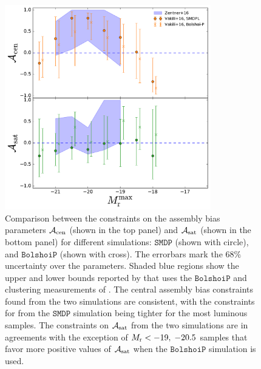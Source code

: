 \documentclass[12pt, preprint]{aastex}
\newcommand{\acen}{\mathcal{A}_{\rm cen}}
\newcommand{\asat}{\mathcal{A}_{\rm sat}}
\begin{document}
\begin{figure}[p]~\\
\begin{center}
\includegraphics[width=0.8\textwidth]{bias_comparison.pdf}
\caption{Comparison between the constraints on the assembly bias parameters $\acen$ (shown in the top panel) and $\asat$ (shown in the bottom panel) for different simulations: $\mathtt{SMDP}$ (shown with circle), and $\mathtt{BolshoiP}$ (shown with cross). The errorbars mark the 68$\%$ uncertainty over the parameters. Shaded blue regions show the upper and lower bounds reported by \citet{zentner2016} that uses the $\mathtt{BolshoiP}$ and clustering measurements of \citet{zehavi2011}. The central assembly bias constraints found from the two simulations are consistent, with the constraints for from the $\mathtt{SMDP}$ simulation being tighter for the most luminous samples. The constraints on $\asat$ from the two simulations are in agreements with the exception of $M_{\rm r}<-19 ,\; -20.5$ samples that favor more positive values of $\asat$ when the $\mathtt{BolshoiP}$ simulation is used.}
\label{fig:bias_comparison}
\end{center}
\end{figure}

\clearpage
\end{document}
